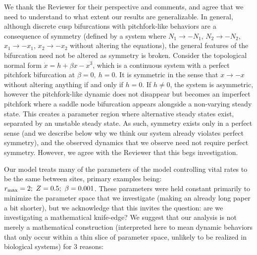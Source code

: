 \documentclass[ucm,12pt]{ucletter}
\begin{document}
\begin{letter}
 We thank the Reviewer for their perspective and comments, and agree that we need to understand to what extent our results are generalizable.
In general, although discrete cusp bifurcations with pitchfork-like behaviors are a consequence of symmetry (defined by a system where $N_1\rightarrow-N_1$, $N_2\rightarrow-N_2$, $x_1\rightarrow-x_1$, $x_2\rightarrow-x_2$ without altering the equations), the general features of the bifurcation need not be altered as symmetry is broken.
Consider the topological normal form $\dot{x}=h + \beta x - x^3$, which is a continuous system with a perfect pitchfork bifurcation at $\beta = 0,~h=0$.
It is symmetric in the sense that $x\rightarrow-x$ without altering anything if and only if $h=0$.
If $h\neq0$, the system is asymmetric, however the pitchfork-like dynamic does not disappear but becomes an imperfect pitchfork where a saddle node bifurcation appears alongside a non-varying steady state.
This creates a parameter region where alternative steady states exist, separated by an unstable steady state.
As such, symmetry exists only in a perfect sense (and we describe below why we think our system already violates perfect symmetry), and the observed dynamics that we observe need not require perfect symmetry. 
However, we agree with the Reviewer that this begs investigation.

Our model treats many of the parameters of the model controlling vital rates to be the same between sites, primary examples being: $r_{\rm max}=2;~Z=0.5;~\beta=0.001$.
These parameters were held constant primarily to minimize the parameter space that we investigate (making an already long paper a bit shorter), but we acknowledge that this invites the question: are we investigating a mathematical knife-edge?
We suggest that our analysis is not merely a mathematical construction (interpreted here to mean dynamic behaviors that only occur within a thin slice of parameter space, unlikely to be realized in biological systems) for 3 reasons:


\end{letter}
\end{document}
